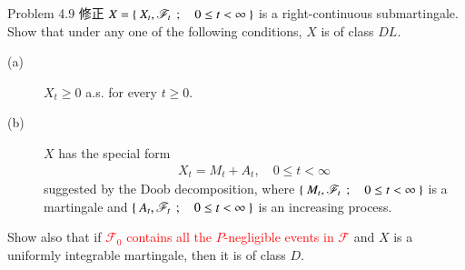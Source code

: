 	\begin{itembox}[l]{Problem 4.9 修正}
		$X = \left\{\ X_t,\mathscr{F}_t\ \, ; \quad 0 \leq t < \infty\ \right\}$ is a right-continuous submartingale.
		Show that under any one of the following conditions, $X$ is of class $DL$.
		\begin{description}
			\item[(a)] $X_t \geq 0$ a.s. for every $t \geq 0$.
			\item[(b)] $X$ has the special form
				\begin{align}
					X_t = M_t + A_t, \quad 0 \leq t < \infty
				\end{align}
				suggested by the Doob decomposition, where $\left\{\ M_t,\mathscr{F}_t\ \, ; \quad 0 \leq t < \infty\ \right\}$
				is a martingale and $\left\{\ A_t,\mathscr{F}_t\ \, ; \quad 0 \leq t < \infty\ \right\}$ is an increasing process.
		\end{description}
		Show also that if \textcolor{red}{$\mathscr{F}_0$ contains all the $P$-negligible events in $\mathscr{F}$} and
		$X$ is a uniformly integrable martingale, then it is of class $D$.
	\end{itembox}
	
